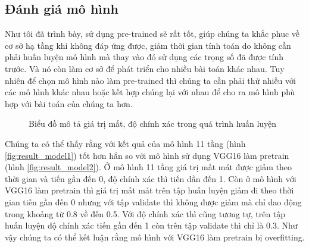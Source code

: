 \subsection{Đánh giá mô hình}
Như tôi đã trình bày, sử dụng pre-trained sẽ rất tốt, giúp chúng ta khắc phuc về cơ sở hạ tầng khi không đáp ứng được, giảm thời gian tính toán do không cần phải huấn luyện mô hình mà thay vào đó sử dụng các trọng số đã được tính trước. Và nó còn làm cơ sở để phát triển cho nhiều bài toán khác nhau. Tuy nhiên để chọn mô hình nào làm pre-trained thì chúng ta cần phải thử nhiều với các mô hình khác nhau hoặc kết hợp chúng lại với nhau để cho ra mô hình phù hợp với bài toán của chúng ta hơn.
\begin{figure}[H]
\hspace{0.3cm}
\caption{Biểu đồ mô tả giá trị mất, độ chính xác trong quá trình huấn luyện}
\end{figure}
Chúng ta có thể thấy rằng với kết quả của mô hình 11 tầng (hình \ref{fig:result_model1}) tốt hơn hẳn so với mô hình sử dụng VGG16 làm pretrain (hình \ref{fig:result_model2}). Ở mô hình 11 tầng giá trị mất mát được giảm theo thời gian và tiến gần đến 0, độ chính xác thì tiến dần đến 1. Còn ở mô hình với VGG16 làm pretrain thì giá trị mất mát trên tập huấn luyện giảm đi theo thời gian tiến gần đến 0 nhưng với tập validate thì không được giảm mà chỉ dao động trong khoảng từ 0.8 về đến 0.5. Với độ chính xác thì cũng tương tự, trên tập huấn luyện độ chính xác tiến gần đến 1 còn trên tập validate thì chỉ là 0.3. Như vậy chúng ta có thể kết luận rằng mô hình với VGG16 làm pretrain bị overfitting. \par
